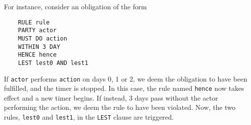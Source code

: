 \documentclass{article}
\begin{document}
For instance, consider an obligation of the form
\begin{lstlisting}
    RULE rule
    PARTY actor
    MUST DO action
    WITHIN 3 DAY
    HENCE hence
    LEST lest0 AND lest1
\end{lstlisting}

If \texttt{actor} performs \texttt{action} on days 0, 1 or 2, we deem the
obligation to have been fulfilled, and the timer is stopped.
In this case, the rule named \texttt{hence} now takes effect and a new timer
begins.
If instead, 3 days pass without the actor performing the action, we deem the
rule to have been violated.
Now, the two rules, \texttt{lest0} and \texttt{lest1}, in the
\texttt{LEST} clause are triggered.











\end{document}

